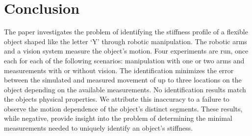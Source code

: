 \documentclass[runningheads,a4paper]{llncs}
\begin{document}
\section{Conclusion}
\label{sec-conc}
The paper investigates the problem of identifying the stiffness profile of a flexible object shaped like the letter `Y' through robotic manipulation. The robotic arms and a vision system measure the object's motion. Four experiments are run, once each for each of the following scenarios: manipulation with one or two arms and measurements with or without vision. The identification minimizes the error between the simulated and measured movement of up to three locations on the object depending on the available measurements. No identification results match the objects physical properties. We attribute this inaccuracy to a failure to observe the motion dependence of the object's distinct segments. These results, while negative, provide insight into the problem of determining the minimal measurements needed to uniquely identify an object's stiffness.




\end{document}
